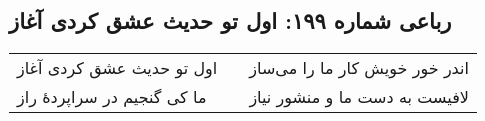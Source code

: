 \begin{center}
\section*{رباعی شماره ۱۹۹: اول تو حدیث عشق کردی آغاز}
\label{sec:sh199}
\begin{longtable}{l p{0.5cm} r}
اول تو حدیث عشق کردی آغاز
&&
اندر خور خویش کار ما را می‌ساز
\\
ما کی گنجیم در سراپردهٔ راز
&&
لافیست به دست ما و منشور نیاز
\\
\end{longtable}
\end{center}
